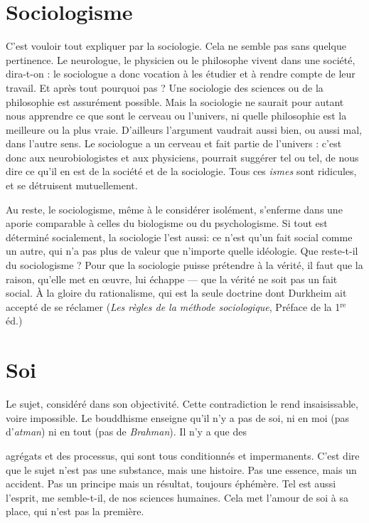 \section{Sociologisme}
C’est vouloir tout expliquer par la sociologie. Cela ne
semble pas sans quelque pertinence. Le neurologue, le
physicien ou le philosophe vivent dans une société, dira-t-on : le sociologue a
donc vocation à les étudier et à rendre compte de leur travail. Et après tout
pourquoi pas ? Une sociologie des sciences ou de la philosophie est assurément
possible. Mais la sociologie ne saurait pour autant nous apprendre ce que sont
le cerveau ou l'univers, ni quelle philosophie est la meilleure ou la plus vraie.
D'ailleurs l'argument vaudrait aussi bien, ou aussi mal, dans l’autre sens. Le
sociologue a un cerveau et fait partie de l’univers : c’est donc aux neurobiologistes
et aux physiciens, pourrait suggérer tel ou tel, de nous dire ce qu’il en est
de la société et de la sociologie. Tous ces {\it ismes} sont ridicules, et se détruisent
mutuellement.

Au reste, le sociologisme, même à le considérer isolément, s’enferme dans
une aporie comparable à celles du biologisme ou du psychologisme. Si tout est
déterminé socialement, la sociologie l’est aussi: ce n’est qu’un fait social
comme un autre, qui n’a pas plus de valeur que n’importe quelle idéologie.
Que reste-t-il du sociologisme ? Pour que la sociologie puisse prétendre à la
vérité, il faut que la raison, qu’elle met en œuvre, lui échappe — que la vérité ne
soit pas un fait social. À la gloire du rationalisme, qui est la seule doctrine dont
Durkheim ait accepté de se réclamer ({\it Les règles de la méthode sociologique}, Préface
de la 1$^{\text{re}}$ éd.)

\section{Soi}
Le sujet, considéré dans son objectivité. Cette contradiction le rend
insaisissable, voire impossible. Le bouddhisme enseigne qu’il n’y a pas
de soi, ni en moi (pas d’{\it atman}) ni en tout (pas de {\it Brahman}). Il n’y a que des

agrégats et des processus, qui sont tous conditionnés et impermanents. C’est
dire que le sujet n’est pas une substance, mais une histoire. Pas une essence,
mais un accident. Pas un principe mais un résultat, toujours éphémère. Tel est
aussi l’esprit, me semble-t-il, de nos sciences humaines. Cela met l'amour de soi
à sa place, qui n’est pas la première.

